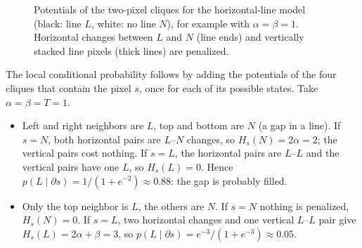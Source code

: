 \begin{figure}[ht]
  \centering
  \caption{Potentials of the two-pixel cliques for the horizontal-line model
  (black: line $L$, white: no line $N$), for example with $\alpha = \beta = 1$.
  Horizontal changes between $L$ and $N$ (line ends) and vertically stacked line
  pixels (thick lines) are penalized.}
  \label{fig:mrf-potentials}
\end{figure}

\noindent
The local conditional probability follows by adding the potentials of the four
cliques that contain the pixel $s$, once for each of its possible states. Take
$\alpha = \beta = T = 1$.
\begin{itemize}
  \item Left and right neighbors are $L$, top and bottom are $N$ (a gap in a
        line). If $s = N$, both horizontal pairs are $L$--$N$ changes, so
        $H_s(N) = 2\alpha = 2$; the vertical pairs cost nothing. If $s = L$, the
        horizontal pairs are $L$--$L$ and the vertical pairs have one $L$, so
        $H_s(L) = 0$. Hence
        $p(L\mid\partial s) = 1/(1+e^{-2})\approx 0.88$: the gap is probably
        filled.
  \item Only the top neighbor is $L$, the others are $N$. If $s = N$ nothing is
        penalized, $H_s(N) = 0$. If $s = L$, two horizontal changes and one
        vertical $L$--$L$ pair give $H_s(L) = 2\alpha + \beta = 3$, so
        $p(L\mid\partial s) = e^{-3}/(1+e^{-3})\approx 0.05$.
\end{itemize}

